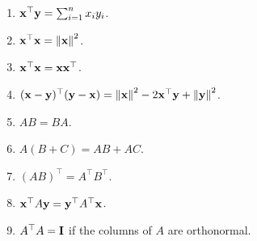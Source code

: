     \begin{enumerate}
        \item $\mathbf{x}^\top \mathbf{y} = \sum_{i=1}^n x_iy_i$.
        
        \item $\mathbf{x}^\top \mathbf{x} = \left\|\mathbf{x} \right\|^2$.
        
        \item $\mathbf{x}^\top \mathbf{x} = \mathbf{x}\mathbf{x}^\top$.
        
        \item $(\mathbf{x}-\mathbf{y})^\top(\mathbf{y}-\mathbf{x}) = \left\|\mathbf{x} \right\|^2 - 2\mathbf{x}^\top \mathbf{y} + \left\|\mathbf{y} \right\|^2$.
        
        \item $AB=BA$.
        
        \item $A(B + C) = AB + AC$.
        
        \item $(AB)^\top = A^\top B^\top$.
        
        \item $\mathbf{x}^\top A\mathbf{y} = \mathbf{y}^\top A^\top \mathbf{x}$.
        
        \item $A^\top A = \mathbf{I}$ if the columns of $A$ are orthonormal.
    \end{enumerate}

    \clearpage



